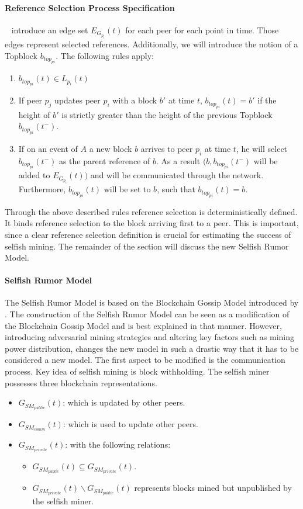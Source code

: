 \paragraph{Reference Selection Process Specification}
\gopalan~ introduce an edge set $E_{G_{p_i}}(t)$ for each peer for each point in time. Those edges represent selected references.
Additionally, we will introduce the notion of a Topblock $b_{{top}_{pi}}$.
The following rules apply:
\begin{enumerate}
\item $b_{{top}_{pi}}(t) \in L_{p_i}(t)$
\item If peer $p_j$ updates peer $p_i$ with a block $b'$ at time $t$, $b_{{top}_{pi}}(t) = b'$ if the height of $b'$ is strictly greater than the height of the previous Topblock $b_{{top}_{pi}}(t^-)$.
\item If on an event of $A$ a new block $b$ arrives to peer $p_i$ at time $t$, he will select $b_{{top}_{pi}}(t^-)$ as the parent reference of $b$. As a result $(b,b_{{top}_{pi}}(t^-)$ will be added to $E_{G_{p_i}}(t))$ and will be communicated through the network. Furthermore, $b_{{top}_{pi}}(t)$ will be set to $b$, such that $b_{{top}_{pi}}(t) = b$.
\end{enumerate} 
Through the above described rules reference selection is deterministically defined. It binds reference selection to the block arriving first to a peer. This is important, since a clear reference selection definition is crucial for estimating the success of selfish mining. The remainder of the section will discuss the new Selfish Rumor Model.

\paragraph{Selfish Rumor Model}
The Selfish Rumor Model is based on the Blockchain Gossip Model introduced by \gopalan . The construction of the Selfish Rumor Model can be seen as a modification of the Blockchain Gossip Model and is best explained in that manner. However, introducing adversarial mining strategies and altering key factors such as mining power distribution, changes the new model in such a drastic way that it has to be considered a new model.
The first aspect to be modified is the communication process. 
Key idea of selfish mining is block withholding. The selfish miner possesses three blockchain representations. 
\begin{itemize}
\item $G_{SM_{public}}(t)$: which is updated by other peers.
\item $G_{SM_{comm}}(t)$: which is used to update other peers.
\item $G_{SM_{private}}(t)$: with the following relations:
		\begin{itemize}
		\item $G_{SM_{public}}(t)\subseteq G_{SM_{private}}(t)$.
		\item $G_{SM_{private}}(t)\backslash G_{SM_{public}}(t)$ represents blocks mined but unpublished by the selfish miner.
\end{itemize}		
\end{itemize}



